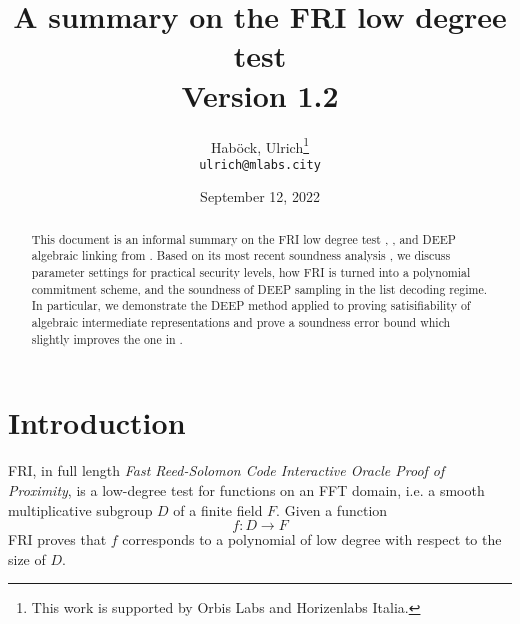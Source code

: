 \documentclass[11pt,article,oneside]{memoir}
\author{
    Hab{\"o}ck, Ulrich\thanks{This work is supported by Orbis Labs and Horizenlabs Italia.}
\\
    \texttt{ulrich@mlabs.city}
}
\theoremstyle{definition}
\theoremstyle{remark}
\begin{document}
\title{%
A summary on the FRI low degree test
\\
{\small Version 1.2}
}
\date{%
September 12, 2022
}
\maketitle

\setlength{\parskip}{5mm}


\begin{abstract}
This document is an informal summary on the FRI low degree test \cite{FRI}, \cite{ProximityGaps}, and DEEP algebraic linking from \cite{DEEPFRI}. 
Based on its most recent soundness analysis \cite{ProximityGaps}, we discuss parameter settings for practical security levels, how FRI is turned into a polynomial commitment scheme, and the soundness of DEEP sampling in the list decoding regime.
In particular, we demonstrate the DEEP method applied to proving satisifiability of algebraic intermediate representations and prove a soundness error bound which slightly improves  the one in \cite{ethSTARK}.
\end{abstract}


\begin{KeepFromToc}
  \tableofcontents
\end{KeepFromToc}

\chapter{Introduction}
FRI, in full length \textit{Fast Reed-Solomon Code Interactive Oracle Proof of Proximity}, is a low-degree test for functions on an FFT domain, i.e. a smooth multiplicative subgroup $D$ of a finite field $F$.  
Given a function 
\[
f: D\longrightarrow F
\]
FRI proves that $f$ corresponds to a polynomial of low degree with respect to the size of $D$. 
\end{document}

